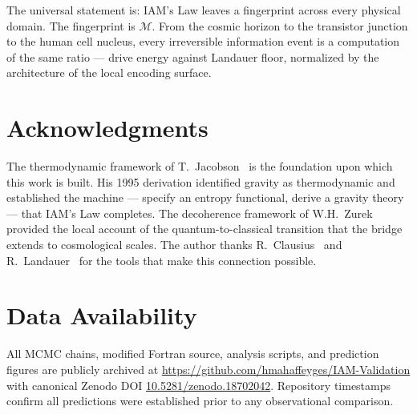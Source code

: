 \documentclass[12pt,a4paper]{article}
\begin{document}
The universal statement is: IAM's Law leaves a fingerprint across every
physical domain. The fingerprint is $\mathcal{M}$. From the cosmic
horizon to the transistor junction to the human cell nucleus, every
irreversible information event is a computation of the same ratio ---
drive energy against Landauer floor, normalized by the architecture of
the local encoding surface.

\section*{Acknowledgments}

The thermodynamic framework of T.\ Jacobson~\citep{Jacobson1995} is
the foundation upon which this work is built. His 1995 derivation
identified gravity as thermodynamic and established the machine ---
specify an entropy functional, derive a gravity theory --- that IAM's
Law completes. The decoherence
framework of W.H.\ Zurek~\citep{Zurek2003} provided the local account
of the quantum-to-classical transition that the bridge extends to
cosmological scales. The author thanks R.\ Clausius~\citep{Clausius1870}
and R.\ Landauer~\citep{Landauer1961} for the tools that make this
connection possible.

\section*{Data Availability}

All MCMC chains, modified Fortran source, analysis scripts, and
prediction figures are publicly archived at
\url{https://github.com/hmahaffeyges/IAM-Validation} with canonical
Zenodo DOI
\href{https://doi.org/10.5281/zenodo.18702042}{10.5281/zenodo.18702042}.
Repository timestamps confirm all predictions were established prior
to any observational comparison.



\end{document}
